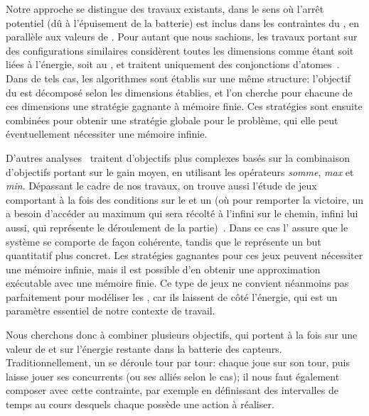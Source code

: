 Notre approche se distingue des travaux existants, dans le sens où l'arrêt potentiel (dû à l'épuisement de la batterie) est inclus dans les contraintes du , en parallèle aux valeurs de .
Pour autant que nous sachions, les travaux portant sur des configurations similaires considèrent toutes les dimensions comme étant soit liées à l'énergie, soit au , et traitent uniquement des conjonctions d'atomes~\cite{chatterjee12,velner12a}.
Dans de tels cas, les algorithmes sont établis sur une même structure: l'objectif du  est décomposé selon les dimensions établies, et l'on cherche pour chacune de ces dimensions une stratégie gagnante à mémoire finie.
Ces stratégies sont ensuite combinées pour obtenir une stratégie globale pour le problème, qui elle peut éventuellement nécessiter une mémoire infinie.

D'autres analyses~\cite{velner12b} traitent d'objectifs plus complexes basés sur la combinaison d'objectifs portant sur le gain moyen, en utilisant les opérateurs \textit{somme}, \textit{max} et \textit{min}.
Dépassant le cadre de nos travaux, on trouve aussi l'étude de jeux comportant à la fois des conditions sur le  et un  (où pour remporter la victoire, un  a besoin d'accéder au  maximum qui sera récolté à l'infini sur le chemin, infini lui aussi, qui représente le déroulement de la partie)~\cite{chatterjee05}.
Dans ce cas l' assure que le système se comporte de façon cohérente, tandis que le  représente un but quantitatif plus concret.
Les stratégies gagnantes pour ces jeux peuvent nécessiter une mémoire infinie, mais il est possible d'en obtenir une approximation exécutable avec une mémoire finie.
Ce type de jeux ne convient néanmoins pas parfaitement pour modéliser les \rcs, car ils laissent de côté l'énergie, qui est un paramètre essentiel de notre contexte de travail.

Nous cherchons donc à combiner plusieurs objectifs, qui portent à la fois sur une valeur de  et sur l'énergie restante dans la batterie des capteurs.
Traditionnellement, un  se déroule tour par tour: chaque  joue sur son tour, puis laisse jouer ses concurrents (ou ses alliés selon le cas); il nous faut également composer avec cette contrainte, par exemple en définissant des intervalles de temps au cours desquels chaque  possède une action à réaliser.

